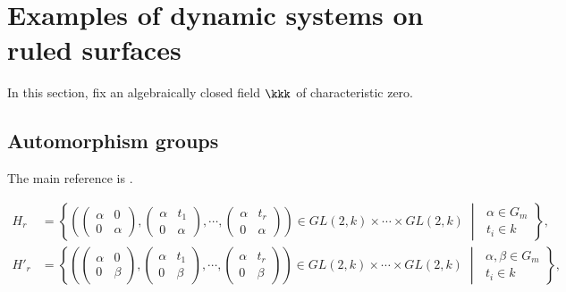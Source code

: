 \section{Examples of dynamic systems on ruled surfaces}

In this section, fix an algebraically closed field \(\kkk\) of characteristic zero.

\subsection{Automorphism groups}

    The main reference is \cite{Mar71}.

    \[ \begin{aligned}
        H_r &= \left\{ \left( 
            \begin{pmatrix}\alpha & 0 \\0 & \alpha\end{pmatrix}, 
            \begin{pmatrix}\alpha & t_1 \\0 & \alpha\end{pmatrix}, 
            \cdots, 
            \begin{pmatrix}\alpha & t_r \\0 & \alpha\end{pmatrix} 
        \right) \in GL(2,k) \times \cdots \times GL(2,k) 
        \;\middle|\;
        \begin{array}{l}
            \alpha \in G_m \\
            t_i \in k
        \end{array} \right\} , \\
        H'_r &= \left\{ \left(
            \begin{pmatrix}\alpha & 0 \\0 & \beta\end{pmatrix}, 
            \begin{pmatrix}\alpha & t_1 \\0 & \beta\end{pmatrix}, 
            \cdots, 
            \begin{pmatrix}\alpha & t_r \\0 & \beta\end{pmatrix} 
        \right) \in GL(2,k) \times \cdots \times GL(2,k) 
        \;\middle|\;
        \begin{array}{l}
            \alpha, \beta \in G_m \\
            t_i \in k
        \end{array} \right\} , \\

\end{aligned}\]
